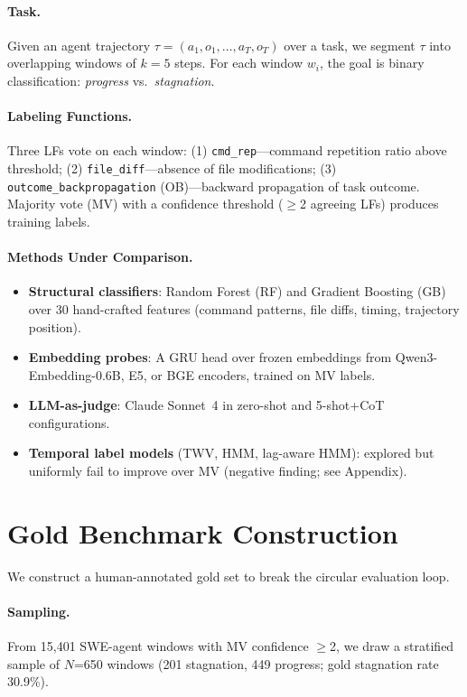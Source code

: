 \documentclass[11pt,a4paper]{article}
\begin{document}
\paragraph{Task.}
Given an agent trajectory $\tau = (a_1, o_1, \ldots, a_T, o_T)$ over a task, we segment $\tau$ into overlapping windows of $k=5$ steps.
For each window $w_i$, the goal is binary classification: \emph{progress} vs.\ \emph{stagnation}.

\paragraph{Labeling Functions.}
Three LFs vote on each window: (1) \texttt{cmd\_rep}---command repetition ratio above threshold; (2) \texttt{file\_diff}---absence of file modifications; (3) \texttt{outcome\_backpropagation} (OB)---backward propagation of task outcome.
Majority vote (MV) with a confidence threshold ($\geq$2 agreeing LFs) produces training labels.

\paragraph{Methods Under Comparison.}
\begin{itemize}[nosep,leftmargin=*]
\item \textbf{Structural classifiers}: Random Forest (RF) and Gradient Boosting (GB) over 30 hand-crafted features (command patterns, file diffs, timing, trajectory position).
\item \textbf{Embedding probes}: A GRU head over frozen embeddings from Qwen3-Embedding-0.6B, E5, or BGE encoders, trained on MV labels.
\item \textbf{LLM-as-judge}: Claude Sonnet~4 in zero-shot and 5-shot+CoT configurations.
\item \textbf{Temporal label models} (TWV, HMM, lag-aware HMM): explored but uniformly fail to improve over MV (negative finding; see Appendix).
\end{itemize}

\section{Gold Benchmark Construction}
\label{sec:gold}

We construct a human-annotated gold set to break the circular evaluation loop.

\paragraph{Sampling.}
From 15,401 SWE-agent windows with MV confidence $\geq$2, we draw a stratified sample of $N$=650 windows (201 stagnation, 449 progress; gold stagnation rate 30.9\%).
\end{document}
